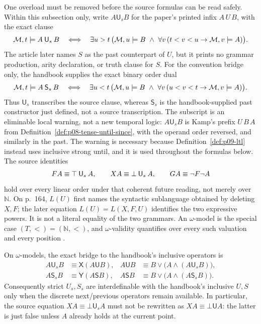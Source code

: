 One overload must be removed before the source formulas can be read safely.
Within this subsection only, write \(A\mathbin{\mathsf U_s}B\) for the paper's
printed infix \(A\,U\,B\), with the exact clause
\[
 \mathcal M,t\models A\mathbin{\mathsf U_s}B
 \quad\Longleftrightarrow\quad
 \exists u>t\,
 \bigl(\mathcal M,u\models B\ \land\
   \forall v\,(t<v<u\to\mathcal M,v\models A)\bigr).
\]
The article later names \(S\) as the past counterpart of \(U\), but it prints
no grammar production, arity declaration, or truth clause for \(S\).  For the
convention bridge only, the handbook supplies the exact binary order dual
\[
 \mathcal M,t\models A\mathbin{\mathsf S_s}B
 \quad\Longleftrightarrow\quad
 \exists u<t\,
 \bigl(\mathcal M,u\models B\ \land\
   \forall v\,(u<v<t\to\mathcal M,v\models A)\bigr).
\]
Thus \(\mathsf U_s\) transcribes the source clause, whereas \(\mathsf S_s\) is
the handbook-supplied past constructor just defined, not a source
transcription.  The subscript is an eliminable local warning, not a new
temporal logic: \(A\mathbin{\mathsf U_s}B\) is Kamp's prefix
\(U\,B\,A\) from Definition~\ref{def:p08-tense-until-since}, with the operand
order reversed, and similarly in the past.  The warning is necessary because
Definition~\ref{def:p09-ltl} instead uses inclusive strong until, and it is used
throughout the formulas below.  The source identities
\[
 FA\equiv \top\mathbin{\mathsf U_s}A,
 \qquad
 XA\equiv \bot\mathbin{\mathsf U_s}A,
 \qquad
 GA\equiv\neg F\neg A
\]
hold over every linear order under that coherent future reading, not merely
over \(\mathbb N\).  On p.~164, \(L(U)\) first names the syntactic sublanguage
obtained by deleting \(X,F\); the later equation \(L(U)=L(X,F,U)\) identifies
the two expressive powers.  It is not a literal equality of the two grammars.
An \(\omega\)-model is the special case \((T,<)=(\mathbb N,<)\),
and \(\omega\)-validity quantifies over every such valuation and every
position \cite[pp.~163--164]{GabbayPnueliShelahStavi1980}.

On \(\omega\)-models, the exact bridge to the handbook's inclusive operators
is
\[
\begin{aligned}
 A\mathbin{\mathsf U_s}B
   &\equiv \mathsf X(A\mathbin{\mathsf U}B),
 &A\mathbin{\mathsf U}B
   &\equiv B\lor\bigl(A\land
      (A\mathbin{\mathsf U_s}B)\bigr),\\
 A\mathbin{\mathsf S_s}B
   &\equiv \mathsf Y(A\mathbin{\mathsf S}B),
 &A\mathbin{\mathsf S}B
   &\equiv B\lor\bigl(A\land
      (A\mathbin{\mathsf S_s}B)\bigr).
\end{aligned}
\]
Consequently strict \(U_s,S_s\) are interdefinable with the handbook's
inclusive \(U,S\) only when the discrete next/previous operators remain
available.  In particular, the source equation
\(XA\equiv\bot\mathbin{\mathsf U_s}A\) must not be rewritten as
\(XA\equiv\bot\mathbin{\mathsf U}A\): the latter is just false unless \(A\)
already holds at the current point.

